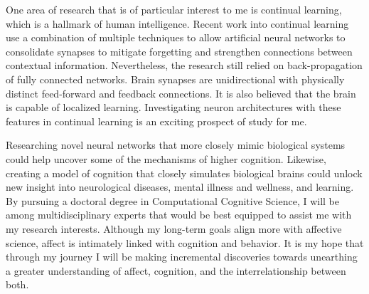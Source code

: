 \documentclass[12pt]{article}
\begin{document}
One
area of research that is of particular interest to me is continual learning, which is a
hallmark of human intelligence.  Recent work into continual learning use a
combination of multiple techniques to allow artificial neural networks to
consolidate synapses to mitigate forgetting and strengthen connections between
contextual information.  Nevertheless, the research still relied on
back-propagation of fully connected networks.  Brain synapses are unidirectional
with physically distinct feed-forward and feedback connections. It is also
believed that the brain is capable of localized learning. Investigating neuron
architectures with these features in continual learning is an exciting prospect
of study for me.

Researching novel neural networks that more closely mimic biological systems could
help uncover some of the mechanisms of higher cognition.  Likewise, creating a model of
cognition that closely simulates biological brains could unlock new insight into
neurological diseases, mental illness and wellness, and learning.  By pursuing a
doctoral degree in Computational Cognitive Science, I will be among
multidisciplinary experts that would be best equipped to assist me with my
research interests.  Although my long-term goals align more with affective
science, affect is intimately linked with cognition and behavior.  It is my hope
that through my journey I will be making incremental discoveries towards
unearthing a greater understanding of affect, cognition, and the
interrelationship between both.
\end{document}
